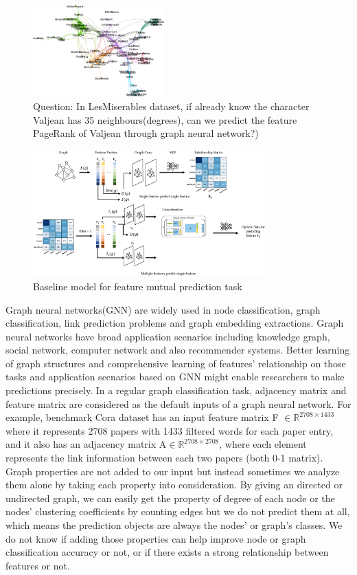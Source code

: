 \documentclass[sigconf]{acmart}
\begin{document}
\begin{figure}[!h]
    \centering
    \includegraphics[width = 0.45\textwidth]{fig/LesMiserables.eps}
    \caption{Question: In LesMiserables dataset, if already know the character Valjean has 35 neighbours(degrees), can we predict the feature PageRank of Valjean through graph neural network?) }
\end{figure}

\begin{figure}
    \centering
    \includegraphics[width=0.8\textwidth]{output.eps}
    \caption{Baseline model for feature mutual prediction task}
\end{figure}


 Graph neural networks(GNN) are widely used in node classification, graph classification, link prediction problems and graph embedding extractions. Graph neural networks have broad application scenarios including knowledge graph, social network, computer network and also recommender systems. Better learning of graph structures and comprehensive learning of features' relationship on those tasks and application scenarios based on GNN might enable researchers to make predictions precisely. In a regular graph classification task, adjacency matrix and feature matrix are considered as the default inputs of a graph neural network. For example, benchmark Cora dataset has an input feature matrix F  $\in \mathbb{R}^{2708 \times1433}$ where it represents 2708 papers with 1433 filtered words for each paper entry, and it also has an adjacency matrix A$ \in \mathbb{R}^{2708 \times2708}$, 
where each element represents the link information between each two papers (both 0-1 matrix). Graph properties are not added to our input but instead sometimes we analyze them alone by taking each property into consideration. By giving an directed or undirected graph, we can easily get the property of degree of each node or the nodes' clustering coefficients by counting edges but we do not predict them at all, which means the prediction objects are always the nodes' or graph's classes. We do not know if adding those properties can help improve node or graph classification accuracy or not, or if there exists a strong relationship between features or not. 
\end{document}

